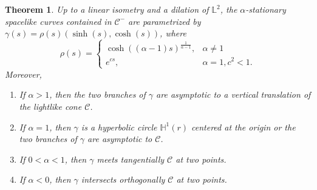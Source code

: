 \documentclass[a4paper,12pt]{amsart}
\newtheorem{theorem}{Theorem}[section]
\theoremstyle{definition}
\def\h{\mathbb H}
\def\l{\mathbb L}
\begin{document}
\begin{theorem} \label{pr41}
Up to a linear isometry and a dilation of $\l^2$, the   $\alpha$-stationary spacelike curves contained in $\mathcal{C}^-$ are parametrized by $\gamma(s)=\rho(s)(\sinh(s),\cosh(s))$, where 
\begin{equation}\label{so}
\rho(s)=\left\{\begin{array}{ll}
 \cosh((\alpha-1) s)^\frac{1}{\alpha-1},&\alpha\not=1\\
 e^{c s},&\alpha=1, c^2<1.
 \end{array}
 \right.
\end{equation}
 Moreover, 
\begin{enumerate}
\item If $\alpha> 1$, then  the two branches of  $\gamma$ are asymptotic to a vertical translation of the lightlike cone $\mathcal{C}$.  
\item If $\alpha=1$, then $\gamma$ is a hyperbolic circle $\h^1(r)$ centered at the origin or the two branches of $\gamma$ are asymptotic to $\mathcal{C}$. 
\item If $0<\alpha<1$, then $\gamma$ meets tangentially $\mathcal{C}$ at two points.  
\item If $\alpha<0$, then $\gamma$ intersects orthogonally $\mathcal{C}$ at two points.
\end{enumerate}
\end{theorem}
 
\end{document}

